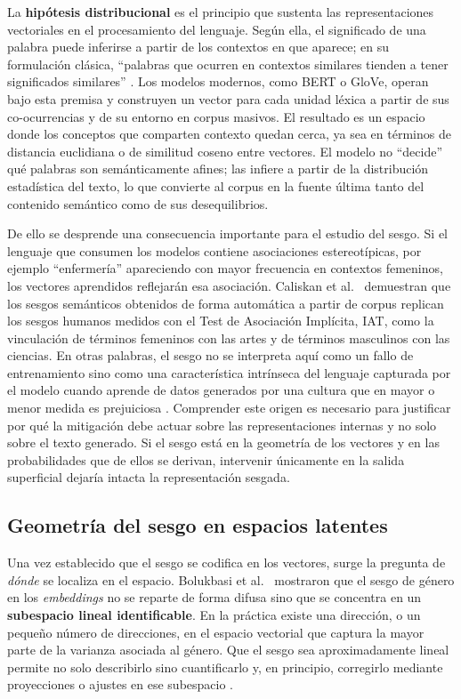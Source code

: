 \documentclass[12pt,a4paper]{report}
\begin{document}
La \textbf{hipótesis distribucional} es el principio que sustenta las representaciones vectoriales en el procesamiento del lenguaje. Según ella, el significado de una palabra puede inferirse a partir de los contextos en que aparece; en su formulación clásica, ``palabras que ocurren en contextos similares tienden a tener significados similares'' \cite{caliskan_semantics_2017}. Los modelos modernos, como BERT o GloVe, operan bajo esta premisa y construyen un vector para cada unidad léxica a partir de sus co-ocurrencias y de su entorno en corpus masivos. El resultado es un espacio donde los conceptos que comparten contexto quedan cerca, ya sea en términos de distancia euclidiana o de similitud coseno entre vectores. El modelo no ``decide'' qué palabras son semánticamente afines; las infiere a partir de la distribución estadística del texto, lo que convierte al corpus en la fuente última tanto del contenido semántico como de sus desequilibrios.

De ello se desprende una consecuencia importante para el estudio del sesgo. Si el lenguaje que consumen los modelos contiene asociaciones estereotípicas, por ejemplo ``enfermería'' apareciendo con mayor frecuencia en contextos femeninos, los vectores aprendidos reflejarán esa asociación. Caliskan et al.\ \cite{caliskan_semantics_2017} demuestran que los sesgos semánticos obtenidos de forma automática a partir de corpus replican los sesgos humanos medidos con el Test de Asociación Implícita, IAT, como la vinculación de términos femeninos con las artes y de términos masculinos con las ciencias. En otras palabras, el sesgo no se interpreta aquí como un fallo de entrenamiento sino como una característica intrínseca del lenguaje capturada por el modelo cuando aprende de datos generados por una cultura que en mayor o menor medida es prejuiciosa \cite{caliskan_semantics_2017}. Comprender este origen es necesario para justificar por qué la mitigación debe actuar sobre las representaciones internas y no solo sobre el texto generado. Si el sesgo está en la geometría de los vectores y en las probabilidades que de ellos se derivan, intervenir únicamente en la salida superficial dejaría intacta la representación sesgada.

\subsection{Geometría del sesgo en espacios latentes}
\label{subsec:geometria_sesgo}

Una vez establecido que el sesgo se codifica en los vectores, surge la pregunta de \textit{dónde} se localiza en el espacio. Bolukbasi et al.\ \cite{bolukbasi_man_2016} mostraron que el sesgo de género en los \textit{embeddings} no se reparte de forma difusa sino que se concentra en un \textbf{subespacio lineal identificable}. En la práctica existe una dirección, o un pequeño número de direcciones, en el espacio vectorial que captura la mayor parte de la varianza asociada al género. Que el sesgo sea aproximadamente lineal permite no solo describirlo sino cuantificarlo y, en principio, corregirlo mediante proyecciones o ajustes en ese subespacio \cite{bolukbasi_man_2016}.
\end{document}
